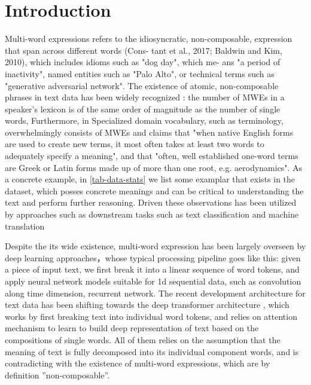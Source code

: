 

\section{Introduction}
Multi-word expressions refers to the idiosyncratic, non-composable, expression that span across different words (Cons- tant et al., 2017; Baldwin and Kim, 2010), which includes
idioms such as "dog day", which me- ans "a period of inactivity", 
named entities such as "Palo Alto", 
or technical terms such as "generative adversarial network". 
The existence of atomic, non-composable phrases in text data has been widely recognized \cite{sag2002multiword, baldwin2010multiword, constant2017multiword, hashimoto2016adaptive}:  \cite{jackendoff1997architecture}
the number of MWEs in a speaker's lexicon is of the same order of magnitude as the number of single words,
Furthermore, in Specialized domain vocabulary, such as terminology, overwhelmingly consists of MWEs
and \cite{justeson1995technical} claims that 
"when native English forms are used to create new terms, it most often takes at least two words to adequately specify a meaning", and that "often, well established one-word terms are Greek or Latin forms made up of more than one root, e.g. aerodynamics". As a concrete example, in \autoref{tab-data-stats} we list some examplar that exists in the dataset, which posses concrete meanings and can be critical to understanding the text and perform further reasoning.
Driven these observations has been utilized by approaches such as downstream tasks such as text classification \cite{furnkranz1998study} and machine translation

Despite the its wide existence,  multi-word expression has been largely overseen by deep learning approaches，whose typical processing pipeline goes like this:
given a piece of input text, we first break it into a linear sequence of word tokens, and apply neural network models suitable for 1d sequential data, 
such as
convolution along time dimension, 
recurrent network.
The recent development architecture for text data has been shifting towards the deep transformer architecture \cite{vaswani2017attention}, 
which works by first breaking text into individual word tokens, 
and relies on attention mechanism to learn to build deep representation of text based on the compositions of single words.
All of them relies on the assumption that the meaning of text is fully decomposed into its individual component words, and is contradicting with the existence of multi-word expressions, which are by definition ''non-composable''.

